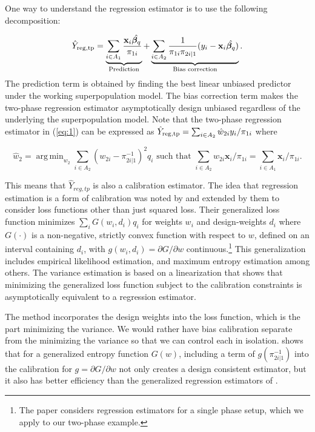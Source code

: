 \documentclass[12pt]{article}
\DeclareMathOperator*{\argmin}{arg\,min}
\renewcommand{\bf}[1]{\mathbf{#1}}
\begin{document}
One way to understand the regression estimator is to use the following decomposition: 

$$ 
\hat Y_{\rm reg, tp} 
= \underbrace{\sum_{i \in A_1} \frac{\bf x_i \hat{\bm \beta_q}}{\pi_{1i}}}_{
  \text{ Prediction  }} + \underbrace{\sum_{i \in A_2}
\frac{1}{\pi_{1i}\pi_{2i|1}} (y_i - \bf x_i \hat{\bm \beta_q})}_{
\text{Bias correction}}.
$$
The prediction term is obtained by finding the best linear unbiased predictor
under the working superpopulation model. The bias correction term 
makes the two-phase regression estimator asymptotically design unbiased
regardless of the underlying the superpopulation model. 
Note that the two-phase regression estimator in (\ref{eq:1})  can be
expressed as  $\hat Y_{\rm reg, tp} =
\sum_{i \in A_2} \hat w_{2i} y_i / \pi_{1i}$ where 

$$
\hat w_{2} = \argmin_{w_2} \sum_{i \in A_2} (w_{2i} - \pi_{2i|1}^{-1})^2 q_i
\text{ such that } \sum_{i \in A_2} w_{2i} \bf x_i / \pi_{1i} = \sum_{i \in A_1}
\bf x_i / \pi_{1i}.
$$

This means that $\hat Y_{reg, tp}$ is also a calibration estimator. The idea
that regression estimation is a form of calibration was noted by
\cite{deville1992calibration} and extended by them to consider loss functions
other than just squared loss. Their generalized loss function minimizes
$\sum_i G(w_i, d_i)q_i$ for weights $w_i$ and design-weights $d_i$ where
$G(\cdot)$ is a non-negative, strictly convex function with respect to $w$,
defined on an interval containing $d_i$, with $g(w_i, d_i) = \partial G /
\partial w$ continuous.\footnote{The \cite{deville1992calibration} paper
considers regression estimators for a single phase setup, which we apply to our
two-phase example.} This
generalization includes empirical likelihood estimation, and maximum entropy
estimation among others. The variance estimation is based on a linearization
that shows that minimizing the generalized loss function subject to the
calibration constraints is asymptotically equivalent to a regression estimator.


The \cite{deville1992calibration} method incorporates the design weights into
the loss function, which is the part minimizing the variance. We would rather
have bias calibration separate from the minimizing the variance so that
we can control each in isolation. 
\cite{kwon2024debiased} shows that for a generalized entropy
function $G(w)$, including a term of $g(\pi_{2i|1}^{-1})$ into the calibration
for $g = \partial G / \partial w$ not only creates a design consistent
estimator, but it also has better efficiency than the generalized regression
estimators of \cite{deville1992calibration}.
\end{document}
